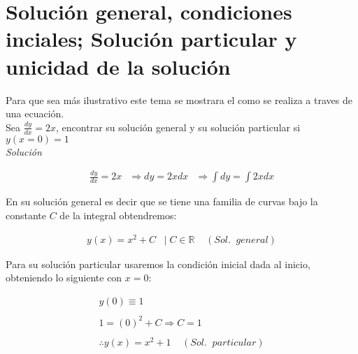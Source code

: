 \section{Solución general, condiciones inciales; Solución particular y unicidad de la solución}

Para que sea más ilustrativo este tema se mostrara el como se realiza a traves de una ecuación.\\

Sea \(\displaystyle\frac{dy}{dx}=2x\), encontrar su solución general y su solución particular si \(\displaystyle y(x=0)=1\)\\

\textit{Solución}

\begin{equation}
    \begin{gathered}
        \frac{dy}{dx}=2x\:\:\;\Rightarrow dy=2xdx\:\:\;\Rightarrow \int dy=\int 2xdx
    \end{gathered}
\end{equation}

En su solución general es decir que se tiene una familia de curvas bajo la constante \(\displaystyle C\) de la integral obtendremos:

\begin{equation*}
    \begin{gathered}
        y(x)=x^{2}+C\;\;\;|\;C \in \mathbb{R}\;\;\;\;(Sol.\;\;general)
    \end{gathered}
\end{equation*}

Para su solución particular usaremos la condición inicial dada al inicio, obteniendo lo siguiente con \(\displaystyle x=0\):

\begin{equation*}
    \begin{gathered}
        y(0)\equiv 1 \\\\
        1=(0)^{2}+C \Rightarrow C=1\\\\
        \therefore y(x)=x^{2}+1\;\;\;\;(Sol.\;\;particular)
    \end{gathered}
\end{equation*}